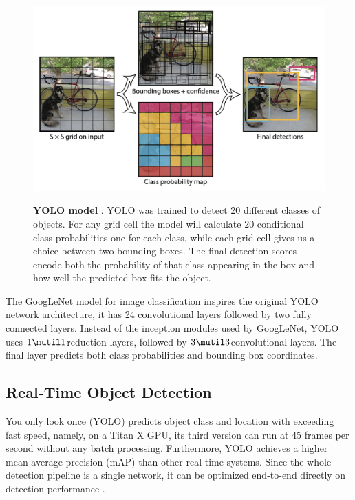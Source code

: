 \begin{figure}[t]
\begin{center}
\centering
\includegraphics[width=\textwidth]{thesis-template-master/images/yolomodel.png}
\label{fig:cellnet}
\end{center}
\caption{\textbf{YOLO model\cite{yolov1} }.  YOLO was trained to detect 20 different classes of objects.  For any grid cell the model will calculate 20 conditional class probabilities one for each class, while each grid cell gives us a choice between two bounding boxes. The final detection scores encode both the probability of that class appearing in the box and how well the predicted box fits the object.}
\end{figure}


The GoogLeNet model for image classification inspires the original  YOLO network architecture, it has 24 convolutional layers followed by two fully connected layers. Instead of the inception modules used by GoogLeNet, YOLO uses $1 \mutil 1 $reduction layers, followed by $3 \mutil 3 $convolutional layers. The final layer predicts both class probabilities and bounding box coordinates.


\subsection{ Real-Time Object Detection }

You only look once (YOLO)  predicts object class and location with exceeding fast speed, namely, on a Titan X GPU, its third version can run at 45 frames per second without any batch processing. Furthermore, YOLO achieves a higher mean average precision (mAP) than other real‐time systems. Since the whole detection pipeline is a single network, it can be optimized end-to-end directly on detection performance \cite{18}.

